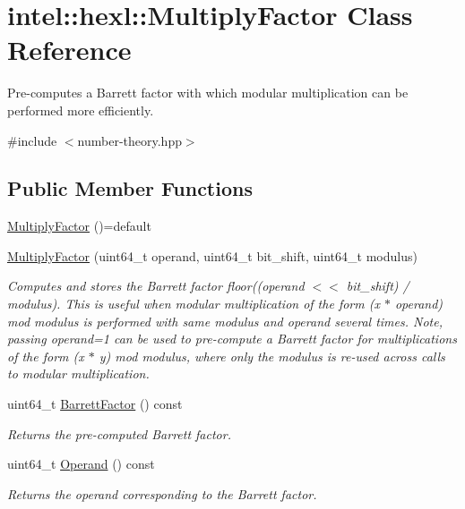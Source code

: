 \hypertarget{classintel_1_1hexl_1_1MultiplyFactor}{}\section{intel\+:\+:hexl\+:\+:Multiply\+Factor Class Reference}
\label{classintel_1_1hexl_1_1MultiplyFactor}


Pre-\/computes a Barrett factor with which modular multiplication can be performed more efficiently.  




{\ttfamily \#include $<$number-\/theory.\+hpp$>$}

\subsection*{Public Member Functions}
\begin{DoxyCompactItemize}
\item 
\hyperlink{classintel_1_1hexl_1_1MultiplyFactor_ad7b998b4a54203d6ad83237e3b3f4c51}{Multiply\+Factor} ()=default
\item 
\hyperlink{classintel_1_1hexl_1_1MultiplyFactor_a801de0aa37e108b21cdb6452a15f6c76}{Multiply\+Factor} (uint64\+\_\+t operand, uint64\+\_\+t bit\+\_\+shift, uint64\+\_\+t modulus)
\begin{DoxyCompactList}\small\item\em Computes and stores the Barrett factor floor((operand $<$$<$ bit\+\_\+shift) / modulus). This is useful when modular multiplication of the form (x $\ast$ operand) mod modulus is performed with same modulus and operand several times. Note, passing operand=1 can be used to pre-\/compute a Barrett factor for multiplications of the form (x $\ast$ y) mod modulus, where only the modulus is re-\/used across calls to modular multiplication. \end{DoxyCompactList}\item 
uint64\+\_\+t \hyperlink{classintel_1_1hexl_1_1MultiplyFactor_aa1708edda697a2ebb93f6b2b9b2967aa}{Barrett\+Factor} () const
\begin{DoxyCompactList}\small\item\em Returns the pre-\/computed Barrett factor. \end{DoxyCompactList}\item 
uint64\+\_\+t \hyperlink{classintel_1_1hexl_1_1MultiplyFactor_a143d0ed636511f3cd450286b89687822}{Operand} () const
\begin{DoxyCompactList}\small\item\em Returns the operand corresponding to the Barrett factor. \end{DoxyCompactList}\end{DoxyCompactItemize}


